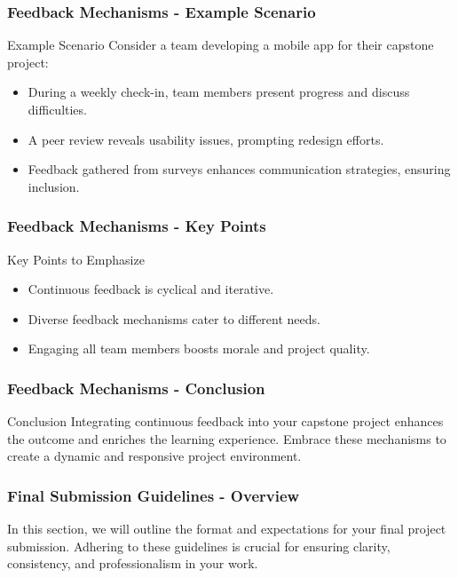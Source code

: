 \documentclass[aspectratio=169]{beamer}
\begin{document}
\begin{frame}[fragile]
    \frametitle{Feedback Mechanisms - Example Scenario}
    \begin{block}{Example Scenario}
        Consider a team developing a mobile app for their capstone project:
        \begin{itemize}
            \item During a weekly check-in, team members present progress and discuss difficulties.
            \item A peer review reveals usability issues, prompting redesign efforts.
            \item Feedback gathered from surveys enhances communication strategies, ensuring inclusion.
        \end{itemize}
    \end{block}
\end{frame}

\begin{frame}[fragile]
    \frametitle{Feedback Mechanisms - Key Points}
    \begin{block}{Key Points to Emphasize}
        \begin{itemize}
            \item Continuous feedback is cyclical and iterative.
            \item Diverse feedback mechanisms cater to different needs.
            \item Engaging all team members boosts morale and project quality.
        \end{itemize}
    \end{block}
\end{frame}

\begin{frame}[fragile]
    \frametitle{Feedback Mechanisms - Conclusion}
    \begin{block}{Conclusion}
        Integrating continuous feedback into your capstone project enhances the outcome and enriches the learning experience. Embrace these mechanisms to create a dynamic and responsive project environment.
    \end{block}
\end{frame}

\begin{frame}[fragile]
  \frametitle{Final Submission Guidelines - Overview}
  In this section, we will outline the format and expectations for your final project submission. Adhering to these guidelines is crucial for ensuring clarity, consistency, and professionalism in your work.
\end{frame}
\end{document}
